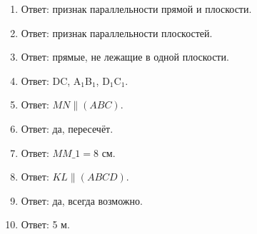 \documentclass{umk-matematika}
\begin{document}
\begin{enumerate}
  \item Ответ: признак параллельности прямой и плоскости.
  \item Ответ: признак параллельности плоскостей.
  \item Ответ: прямые, не лежащие в одной плоскости.
  \item Ответ: DC, A$_1$B$_1$, D$_1$C$_1$.
  \item Ответ: $MN \parallel (ABC)$.
  \item Ответ: да, пересечёт.
  \item Ответ: $MM\_1 = 8$ см.
  \item Ответ: $KL \parallel (ABCD)$.
  \item Ответ: да, всегда возможно.
  \item Ответ: 5 м.
\end{enumerate}
\end{document}
